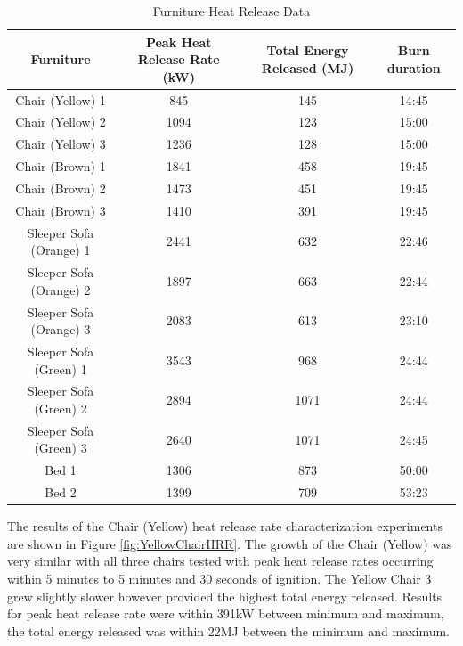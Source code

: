 \documentclass{article}
\begin{document}
\begin{table}[H]
	\caption{Furniture Heat Release Data}
	\begin{tabular}{|c|c|c|c|}
		\hline
		Furniture & Peak Heat Release Rate (kW) & Total Energy Released (MJ) & Burn duration \\ \hline \hline
		Chair (Yellow) 1 & 845 & 145 & 14:45 \\ \hline
		Chair (Yellow) 2 & 1094 & 123 & 15:00 \\ \hline
		Chair (Yellow) 3 & 1236 & 128 & 15:00 \\ \hline
		Chair (Brown) 1 & 1841 & 458 & 19:45 \\ \hline
		Chair (Brown) 2 & 1473 & 451 & 19:45 \\ \hline
		Chair (Brown) 3 & 1410 & 391 & 19:45 \\ \hline
		Sleeper Sofa (Orange) 1  & 2441 & 632 & 22:46 \\ \hline
		Sleeper Sofa (Orange) 2  & 1897 & 663 & 22:44 \\ \hline
		Sleeper Sofa (Orange) 3  & 2083 & 613 & 23:10 \\ \hline
		Sleeper Sofa (Green) 1  & 3543 & 968 & 24:44 \\ \hline
		Sleeper Sofa (Green) 2  & 2894 & 1071 & 24:44 \\ \hline
		Sleeper Sofa (Green) 3  & 2640 & 1071 & 24:45 \\ \hline
		Bed 1 & 1306 & 873 & 50:00 \\ \hline
		Bed 2 & 1399 & 709 & 53:23 \\ \hline
	\end{tabular}
	\label{table:FurnitureHRR_Data}
\end{table}

\clearpage

The results of the Chair (Yellow) heat release rate characterization experiments are shown in Figure \ref{fig:YellowChairHRR}. The growth of the Chair (Yellow) was very similar with all three chairs tested with peak heat release rates occurring within 5 minutes to 5 minutes and 30 seconds of ignition. The Yellow Chair 3 grew slightly slower however provided the highest total energy released. Results for peak heat release rate were within 391kW between minimum and maximum, the total energy released was within 22MJ between the minimum and maximum. 
\end{document}
